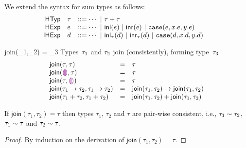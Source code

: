 We extend the syntax for sum types as follows:
\[
\begin{array}{rllllll}
\mathsf{HTyp} & \tau & ::= \cdots ~\vert~ {\tau + \tau} &
\\
\mathsf{HExp} & e & ::= \cdots
~\vert~ \mathsf{inl}(e)
~\vert~ \mathsf{inr}(e)
~\vert~ \texttt{case}({e},{x}.{e},{y}.{e})
\\
\mathsf{IHExp} & d & ::= \cdots
~\vert~ \mathsf{inl}_{\tau}(d)
~\vert~ \mathsf{inr}_{\tau}(d)
~\vert~ \texttt{case}({d},{x}.{d},{y}.{d})
\end{array}
\]


\newcommand{\JoinTypes}[2]{\textsf{join}(#1,#2)}

\judgbox
 {\JoinTypes{\htau_1}{\htau_2} = \htau_3}
 {Types~$\tau_1$ and $\tau_2$ join (consistently), forming type~$\tau_3$}
\[
\begin{array}{lcl}
\JoinTypes{\htau}{\htau} &=&  \htau
\\
\JoinTypes{\tehole}{\htau} &=&  \htau
\\
\JoinTypes{\htau}{\tehole} &=&  \htau
\\
\JoinTypes
{\tarr{\htau_1}{\htau_2}}
{\tarr{\htau_1}{\htau_2}}
&=&
\tarr{\JoinTypes{\htau_1}{\htau_2}}
     {\JoinTypes{\htau_1}{\htau_2}}
\\
\JoinTypes
{\tsum{\htau_1}{\htau_2}}
{\tsum{\htau_1}{\htau_2}}
&=&
\tsum{\JoinTypes{\htau_1}{\htau_2}}
     {\JoinTypes{\htau_1}{\htau_2}}
\end{array}
\]

\begin{thm}[Joins]
If $\JoinTypes{\tau_1}{\tau_2} = \tau$ 
%
then types $\tau_1$, $\tau_2$ and $\tau$ are pair-wise consistent, i.e.,
%
$\tau_1 \sim \tau_2$, 
$\tau_1 \sim \tau$ and 
$\tau_2 \sim \tau$.
\begin{proof}
By induction on the derivation of $\JoinTypes{\tau_1}{\tau_2} = \tau$.
\end{proof}
\end{thm}

